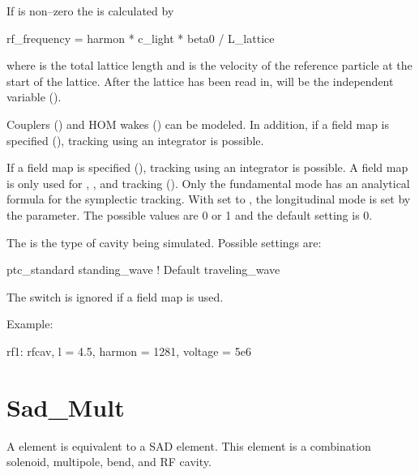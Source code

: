 {If  is non--zero the  is calculated by
\begin{example}
  rf_frequency = harmon * c_light * beta0 / L_lattice 
\end{example}
where  is the total lattice length and  is the
velocity of the reference particle at the start of the lattice. After
the lattice has been read in,  will be the
independent variable ().

Couplers () and HOM wakes () can
be modeled. In addition, if a field map is specified
(), tracking using an integrator is possible.

If a field map is specified (), tracking using an integrator is possible. A field
map is only used for , , and  tracking
(). Only the fundamental mode has an analytical formula for the symplectic
tracking. With  set to , the longitudinal mode is set by the
 parameter. The possible values are 0 or 1 and the default setting is 0.

The  is the type of cavity being simulated. Possible
settings are:
\begin{example}
  ptc_standard
  standing_wave    ! Default
  traveling_wave
\end{example}
The  switch is ignored if a field map is used.

Example:
\begin{example}
  rf1: rfcav, l = 4.5, harmon = 1281, voltage = 5e6
\end{example}

\newpage

\section{Sad_Mult}
\label{s:sad.mult}

A  element is equivalent to a SAD\cite{b:sad} 
element. This element is a combination solenoid, multipole, bend, and
RF cavity.

}
